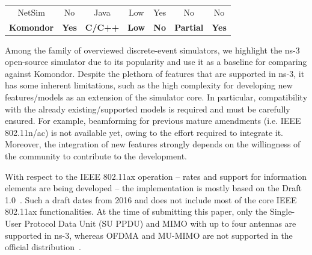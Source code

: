 \documentclass{article}
\begin{document}
\begin{table}[t!]
{\begin{tabular}{@{}ccccccc@{}}
				NetSim    & No          & Java                                                      & Low        & Yes                                                         & No                                                      & No                                                        \\
				\textbf{Komondor}  & \textbf{Yes}         & \textbf{C/C++}                                                     & \textbf{Low}        & \textbf{No}                                                          & \textbf{Partial}                                                 & \textbf{Yes}                                                       \\ \bottomrule
		\end{tabular}}
	\end{table}
	
	Among the family of overviewed discrete-event simulators, we highlight the ns-3 open-source simulator due to its popularity and use it as a baseline for comparing against Komondor. Despite the plethora of features that are supported in ns-3, it has some inherent limitations, such as the high complexity for developing new features/models as an extension of the simulator core. In particular, compatibility with the already existing/supported models is required and must be carefully ensured. For example, beamforming for previous mature amendments (i.e. IEEE 802.11n/ac) is not available yet, owing to the effort required to integrate it. Moreover, the integration of new features strongly depends on the willingness of the community to contribute to the development.
	
	With respect to the IEEE 802.11ax operation -- rates and support for information elements are being developed -- the implementation is mostly based on the Draft 1.0~\cite{stacey2016proposed}. Such a draft dates from 2016 and does not include most of the core IEEE 802.11ax functionalities. At the time of submitting this paper, only the Single-User Protocol Data Unit (SU PPDU) and MIMO with up to four antennas are supported in ns-3, whereas OFDMA and MU-MIMO are not supported in the official distribution~\cite{ns3documentation}.
	
\end{document}
